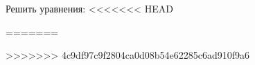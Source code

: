 \begin{ex}[type=multi]
	\begin{condition}
		Решить уравнения:
<<<<<<< HEAD
		\begin{enumcols}[itemcolumns=1]
=======
		\begin{enumcols}[itemcolumns=2]
>>>>>>> 4c9df97c9f2804ca0d08b54e62285c6ad910f9a6
			\item {}
			\item {}
			\item {}
			\item {}
			\item {}
			\item {}
			\item {}
			\item {}
			\item {}
			\item {}
			\item {}
			\item {}
			\item {}
			\item {}
			\item {}
			\item {}
			\item {}
			\item {}
			\item {}
			\item {}
			\item {}
			\item {}
			\item {}
			\item {}
			\item {}
			\item {}
			\item {}
			\item {}
			\item {}
			\item {}
			\item {}
			\item {}
			\item {}
			\item {}
			\item {}

\end{enumcols}
\end{enumcols}
\end{condition}
\end{ex}
